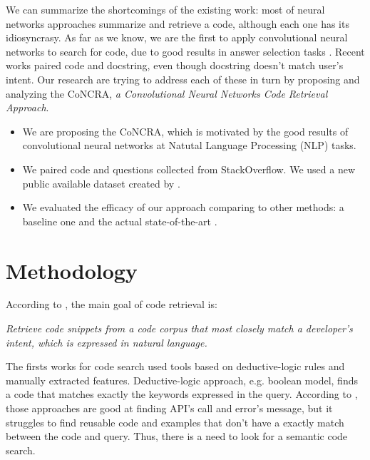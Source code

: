 \documentclass[sigconf]{acmart}
\begin{document}
We can summarize the shortcomings of the existing work: most of neural networks approaches summarize and retrieve a code, although each one has its idiosyncrasy. As far as we know, we are the first to apply convolutional neural networks to search for code, due to good results in answer selection tasks \citep{feng-2015, wen-joint-modeling-question-answer-2019}. Recent works paired code and docstring, even though docstring doesn't match user's intent. Our research are trying to address each of these in turn by proposing and analyzing the CoNCRA, \emph{a Convolutional Neural Networks Code Retrieval Approach}.

\begin{itemize}
    \item We are proposing the CoNCRA, which is motivated
by the good results of convolutional neural networks at Natutal Language Processing (NLP) tasks. 
    \item We paired code and questions collected from StackOverflow. We used a new public available dataset created by \cite{yao-2018}.

    \item We evaluated the efficacy of our approach comparing to other methods: a baseline one and the actual state-of-the-art \cite{cambronero-deep-code-search-2019}.
    
\end{itemize}







\section{Methodology}
\label{sec:methodology}

According to \cite{cambronero-deep-code-search-2019}, the main goal of code retrieval is:

\emph{Retrieve code snippets from a code corpus that most closely match a developer's intent, which is expressed in natural language.}

The firsts works for code search used tools based on deductive-logic rules and manually extracted features. Deductive-logic approach, e.g. boolean model, finds a code that matches exactly the keywords expressed in the query. According to \cite{yan-benchmark-code-search-information-retrieval-deep-learning:2020}, those approaches are good at finding API's call and error's message, but it struggles to find reusable code and examples that don't have a exactly match between the code and query. Thus, there is a need to look for a semantic code search.
\end{document}
